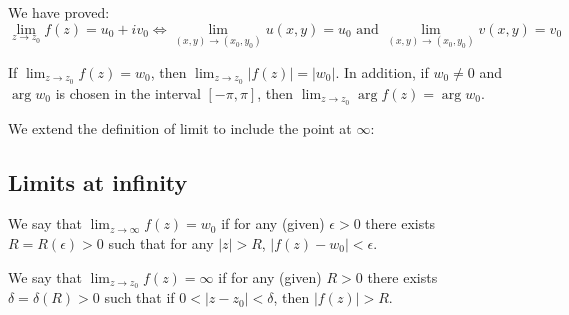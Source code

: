 
% 
% 
% 
% 
% 
% 
% 
% 
% 
% 
% 


\graphicspath{{./input/graphs/note03/}}


% 



We have proved:
\[ \lim_{z \to z_0} f(z) = u_0 + iv_0 \iff \lim_{(x,y) \to (x_0, y_0)} u(x,y) = u_0 \text{ and } \lim_{(x,y) \to (x_0, y_0)} v(x,y) = v_0 \]

\begin{corollary}\label{corollary:3.1}
    If $\lim_{z \to z_0} f(z) = w_0$, then $\lim_{z \to z_0} |f(z)| = |w_0|$. In addition, if $w_0 \neq 0$ and $\arg w_0$ is chosen in the interval $[-\pi, \pi]$, then $\lim_{z \to z_0} \arg f(z) = \arg w_0$.
\end{corollary}

We extend the definition of limit to include the point at $\infty$:

\subsection{Limits at infinity}

\begin{definition}\label{definition:3.2}
    We say that $\lim_{z \to \infty} f(z) = w_0$ if for any (given) $\epsilon > 0$ there exists $R = R(\epsilon) > 0$ such that for any $|z| > R$, $|f(z) - w_0| < \epsilon$.
\end{definition}
\begin{definition}\label{definition:3.3}
    We say that $\lim_{z \to z_0} f(z) = \infty$ if for any (given) $R > 0$ there exists $\delta = \delta(R) > 0$ such that if $0 < |z - z_0| < \delta$, then $|f(z)| > R$.
\end{definition}

